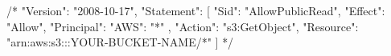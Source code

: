 /*
{
    "Version": "2008-10-17",
    "Statement": [
        {
            "Sid": "AllowPublicRead",
            "Effect": "Allow",
            "Principal": {
                "AWS": "*"
            },
            "Action": "s3:GetObject",
            "Resource": "arn:aws:s3:::YOUR-BUCKET-NAME/*"
        }
    ]
}
*/